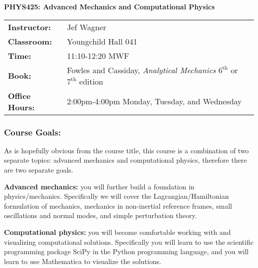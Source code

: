 \documentclass[10pt]{article}
\begin{document}
\thispagestyle{empty}
\mbox{\hspace{1in}}
\vspace{-0.3in}
\begin{center}
{\Large \bf PHYS425: Advanced Mechanics and Computational Physics}
\end{center}

\vspace{0.3cm}

\begin{tabular}{ll}
{\bf Instructor:} & Jef Wagner \\
{\bf Classroom:} & Youngchild Hall 041 \\
{\bf Time:} & 11:10-12:20 MWF \\
{\bf Book:} & Fowles and Cassiday, {\it Analytical Mechanics} $6^{\text{th}}$ or $7^{\text{th}}$ edition \\
{\bf Office Hours:} & 2:00pm-4:00pm Monday, Tuesday, and Wednesday
\end{tabular}

\vspace{-0.1cm}
\subsubsection*{Course Goals:}
As is hopefully obvious from the course title, this course is a combination of two separate topics: advanced mechanics and computational physics, therefore there are two separate goals. 

{\bf Advanced mechanics:} you will further build a foundation in physics/mechanics. Specifically we will cover the Lagrangian/Hamiltonian formulation of mechanics, mechanics in non-inertial reference frames, small oscillations and normal modes, and simple perturbation theory. 

{\bf Computational physics:} you will become comfortable working with and visualizing computational solutions. Specifically you will learn to use the scientific programming package SciPy in the Python programming language, and you will learn to use Mathematica to visualize the solutions.

\vspace{-0.1cm}
\end{document}
